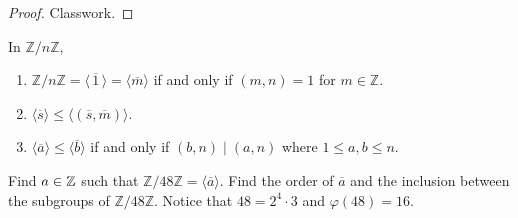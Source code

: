 \documentclass[11pt,a4paper]{article}
\begin{document}
\begin{proof}
    Classwork.
\end{proof}

\begin{rem}
    In \( \mathbb{Z}/n\mathbb{Z} \),
    \begin{enumerate}[label=(\roman*)]
        \item \( \mathbb{Z}/n\mathbb{Z} = \langle \, \overline{1} \, \rangle = \langle \overline{m} \rangle \) if and only if \( (m, n) = 1 \) for \( m \in \mathbb{Z} \).
        \item \( \langle \overline{s} \rangle \leq \langle (\overline{s}, \overline{m}) \rangle \).
        \item \( \langle \overline{a} \rangle \leq \langle \overline{b} \rangle \) if and only if \( (b, n) \mid (a, n) \) where \( 1 \leq a, b \leq n \).
    \end{enumerate}
\end{rem}

\begin{eje}
    Find \(a\in \mathbb{Z}\) such that  \( \mathbb{Z}/48\mathbb{Z} = \langle\overline{a}\rangle \). Find the order of \(\overline{a}\) and the inclusion between the subgroups of \(\mathbb{Z}/48\mathbb{Z}\).  
    Notice that \(48 = 2^4\cdot3\) and \(\varphi(48)= 16\).
\end{eje}
\end{document}

